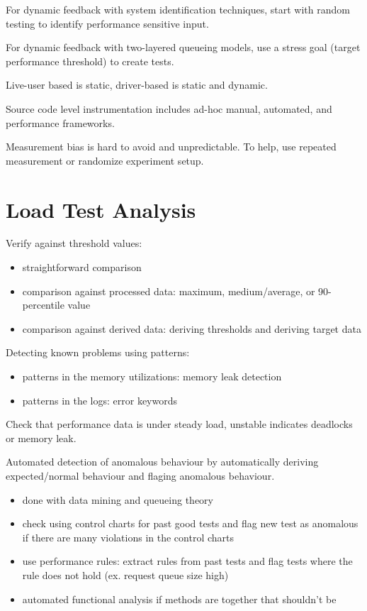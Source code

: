 \documentclass[11pt]{article}
\begin{document}
For dynamic feedback with system identification techniques, start with random testing to identify
performance sensitive input.

For dynamic feedback with two-layered queueing models, use a stress goal (target performance threshold)
to create tests.

Live-user based is static, driver-based is static and dynamic.

Source code level instrumentation includes ad-hoc manual, automated, and performance frameworks.

Measurement bias is hard to avoid and unpredictable.
To help, use repeated measurement or randomize experiment setup.
\section{Load Test Analysis}
\label{sec:org12054f7}
Verify against threshold values:
\begin{itemize}
\item straightforward comparison
\item comparison against processed data: maximum, medium/average, or 90-percentile value
\item comparison against derived data: deriving thresholds and deriving target data
\end{itemize}

Detecting known problems using patterns:
\begin{itemize}
\item patterns in the memory utilizations: memory leak detection
\item patterns in the logs: error keywords
\end{itemize}

Check that performance data is under steady load, unstable indicates deadlocks or memory leak.

Automated detection of anomalous behaviour by automatically deriving expected/normal behaviour
and flaging anomalous behaviour.
\begin{itemize}
\item done with data mining and queueing theory
\item check using control charts for past good tests and flag new test as anomalous if there are many
violations in the control charts
\item use performance rules: extract rules from past tests and flag tests where the rule does not hold
(ex. request queue size high)
\item automated functional analysis if methods are together that shouldn't be
\end{itemize}
\end{document}
